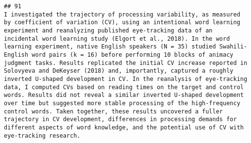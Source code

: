\documentclass[
  english,
  man]{apa6}
\begin{document}
\begin{verbatim}
## 91                                                                                                                                                                                                                                                                                                                                                                                                                                                                                                                                                                                                                                                                                                                                                                                                                                                                                                                                                                                                                                                                                                                                                                                                                                                                                                                                                                                                                                                                                                                                                                                      I investigated the trajectory of processing variability, as measured by coefficient of variation (CV), using an intentional word learning experiment and reanalyzing published eye-tracking data of an incidental word learning study (Elgort et al., 2018). In the word learning experiment, native English speakers (N = 35) studied Swahili-English word pairs (k = 16) before performing 10 blocks of animacy judgment tasks. Results replicated the initial CV increase reported in Solovyeva and DeKeyser (2018) and, importantly, captured a roughly inverted U-shaped development in CV. In the reanalysis of eye-tracking data, I computed CVs based on reading times on the target and control words. Results did not reveal a similar inverted U-shaped development over time but suggested more stable processing of the high-frequency control words. Taken together, these results uncovered a fuller trajectory in CV development, differences in processing demands for different aspects of word knowledge, and the potential use of CV with eye-tracking research.

\end{verbatim}
\end{document}
